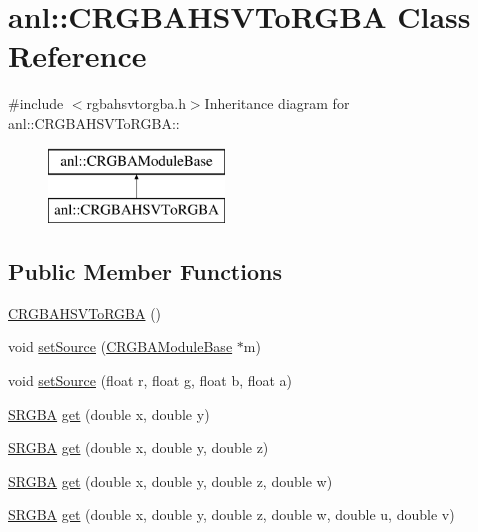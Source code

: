\hypertarget{classanl_1_1CRGBAHSVToRGBA}{
\section{anl::CRGBAHSVToRGBA Class Reference}
\label{classanl_1_1CRGBAHSVToRGBA}
}


{\ttfamily \#include $<$rgbahsvtorgba.h$>$}Inheritance diagram for anl::CRGBAHSVToRGBA::\begin{figure}[H]
\begin{center}
\leavevmode
\includegraphics[height=2cm]{classanl_1_1CRGBAHSVToRGBA}
\end{center}
\end{figure}
\subsection*{Public Member Functions}
\begin{DoxyCompactItemize}
\item 
\hyperlink{classanl_1_1CRGBAHSVToRGBA_aba69497e15efbf87a6199cde006c585f}{CRGBAHSVToRGBA} ()
\item 
void \hyperlink{classanl_1_1CRGBAHSVToRGBA_a89bddaee553fd77a38c6c7038a5bf663}{setSource} (\hyperlink{classanl_1_1CRGBAModuleBase}{CRGBAModuleBase} $\ast$m)
\item 
void \hyperlink{classanl_1_1CRGBAHSVToRGBA_ac4ed09cce0055ebb0d62176001aff8b2}{setSource} (float r, float g, float b, float a)
\item 
\hyperlink{structanl_1_1SRGBA}{SRGBA} \hyperlink{classanl_1_1CRGBAHSVToRGBA_ad1a4aecb9c5faa9927f7a8292cc46546}{get} (double x, double y)
\item 
\hyperlink{structanl_1_1SRGBA}{SRGBA} \hyperlink{classanl_1_1CRGBAHSVToRGBA_a99b2e61622cc799b7112e285903c747c}{get} (double x, double y, double z)
\item 
\hyperlink{structanl_1_1SRGBA}{SRGBA} \hyperlink{classanl_1_1CRGBAHSVToRGBA_ab5fff0b979c8278e0268a1f3ef924572}{get} (double x, double y, double z, double w)
\item 
\hyperlink{structanl_1_1SRGBA}{SRGBA} \hyperlink{classanl_1_1CRGBAHSVToRGBA_adb2d92c8bc56e5996580e111bb8cd703}{get} (double x, double y, double z, double w, double u, double v)
\end{DoxyCompactItemize}
